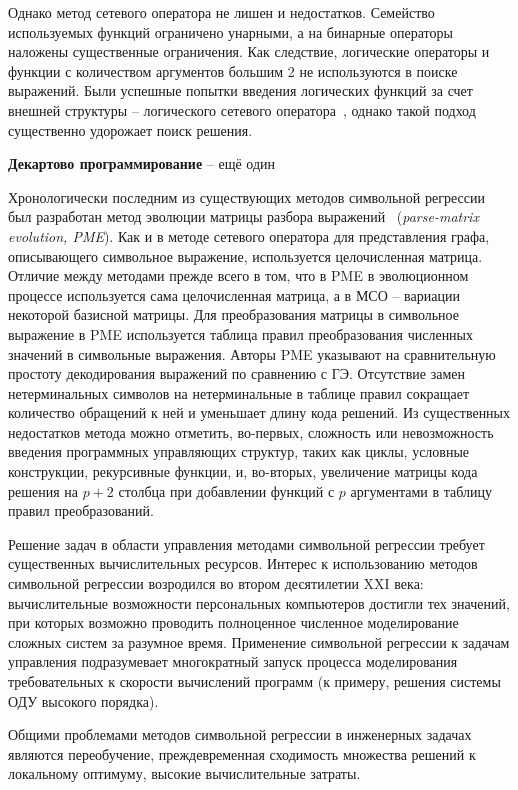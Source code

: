 Однако метод сетевого оператора не лишен и недостатков.
Семейство используемых функций ограничено унарными, а на бинарные операторы наложены существенные ограничения.
Как следствие, логические операторы и функции с количеством аргументов большим 2 не используются в поиске выражений.
Были успешные попытки введения логических функций за счет внешней структуры -- логического сетевого оператора~\cite{ДивСофр2012, АтиенДивеев2012}, однако такой подход существенно удорожает поиск решения.

\textbf{Декартово программирование} -- ещё один 

Хронологически последним из существующих методов символьной регрессии был разработан метод эволюции матрицы разбора выражений~\cite{Luo2012} (\textit{parse-matrix evolution, PME}).
Как и в методе сетевого оператора для представления графа, описывающего символьное выражение, используется целочисленная матрица.
Отличие между методами прежде всего в том, что в PME в эволюционном процессе используется сама целочисленная матрица, а в МСО -- вариации некоторой базисной матрицы.
Для преобразования матрицы в символьное выражение в PME используется таблица правил преобразования численных значений в символьные выражения.
Авторы PME указывают на сравнительную простоту декодирования выражений по сравнению с ГЭ.
Отсутствие замен нетерминальных символов на нетерминальные в таблице правил сокращает количество обращений к ней и уменьшает длину кода решений.
Из существенных недостатков метода можно отметить, во-первых, сложность или невозможность введения программных управляющих структур, таких как циклы, условные конструкции, рекурсивные функции, и, во-вторых, увеличение матрицы кода решения на $p+2$ столбца при добавлении функций с $p$ аргументами в таблицу правил преобразований.

Решение задач в области управления методами символьной регрессии требует существенных вычислительных ресурсов.
Интерес к использованию методов символьной регрессии возродился во втором десятилетии XXI века: вычислительные возможности персональных компьютеров достигли тех значений, при которых возможно проводить полноценное численное моделирование сложных систем за разумное время.
Применение символьной регрессии к задачам управления подразумевает многократный запуск процесса моделирования требовательных к скорости вычислений программ (к примеру, решения системы ОДУ высокого порядка).

Общими проблемами методов символьной регрессии в инженерных задачах являются переобучение, преждевременная сходимость множества решений к локальному оптимуму, высокие вычислительные затраты.

